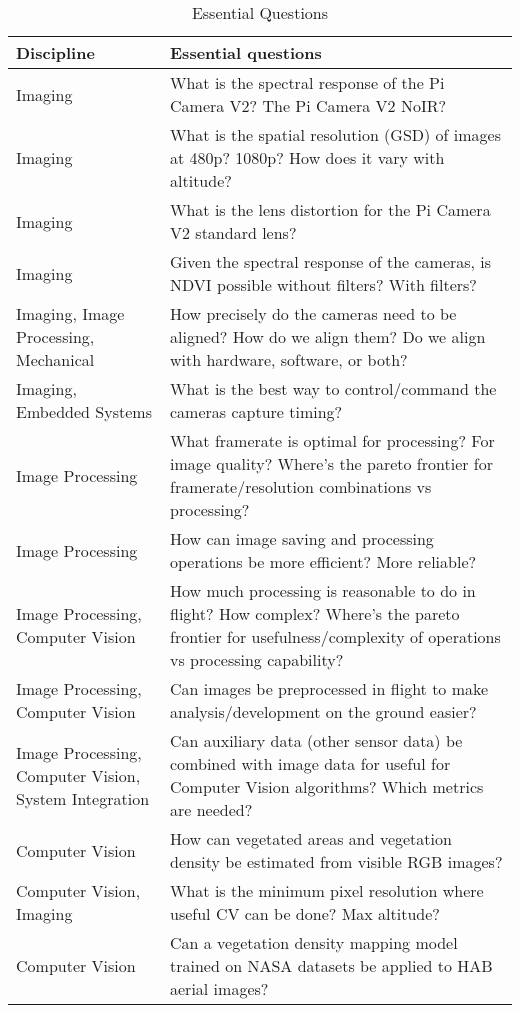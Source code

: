 \documentclass[conference]{IEEEtran} %
\begin{document}
\noindent
\begin{table}[h!]
  \label{essentialquestions}
  \caption{Essential Questions}
  \centering
\begin{tabularx}{\linewidth}{@{}p{}X@{}}
    \textbf{Discipline} & \textbf{Essential questions} \\
    \midrule
    Imaging & What is the spectral response of the Pi Camera V2? The Pi Camera V2 NoIR? \\
    Imaging & What is the spatial resolution (GSD) of images at 480p? 1080p? How does it vary with altitude? \\
    Imaging & What is the lens distortion for the Pi Camera V2 standard lens? \\
    Imaging & Given the spectral response of the cameras, is NDVI possible without filters? With filters? \\
    Imaging, Image Processing, Mechanical & How precisely do the cameras need to be aligned? How do we align them? Do we align with hardware, software, or both? \\
    Imaging, Embedded Systems & What is the best way to control/command the cameras capture timing? \\
    Image Processing & What framerate is optimal for processing? For image quality? Where's the pareto frontier for framerate/resolution combinations vs processing? \\
    Image Processing & How can image saving and processing operations be more efficient? More reliable? \\
    Image Processing, Computer Vision & How much processing is reasonable to do in flight? How complex? Where's the pareto frontier for usefulness/complexity of operations vs processing capability? \\
    Image Processing, Computer Vision & Can images be preprocessed in flight to make analysis/development on the ground easier? \\
    Image Processing, Computer Vision, System Integration & Can auxiliary data (other sensor data) be combined with image data for useful for Computer Vision algorithms? Which metrics are needed? \\
    Computer Vision & How can vegetated areas and vegetation density be estimated from visible RGB images? \\
    Computer Vision, Imaging & What is the minimum pixel resolution where useful CV can be done? Max altitude? \\
    Computer Vision & Can a vegetation density mapping model trained on NASA datasets be applied to HAB aerial images? \\

\end{tabularx}
\end{table}
\end{document}
